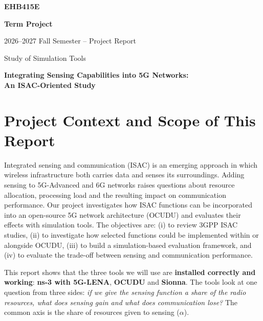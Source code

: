 \documentclass[10.5pt,a4paper]{article}
\begin{document}
\thispagestyle{empty}
\begin{center}
\vspace*{3.2cm}
{\bfseries\LARGE EHB415E\par}
\vspace{1.2cm}
{\bfseries\LARGE Term Project\par}
\vspace{2.2cm}
{\large 2026--2027 Fall Semester -- Project Report\par}
\vspace{0.5cm}
{\large Study of Simulation Tools\par}
\vspace{1.6cm}
{\bfseries\Large Integrating Sensing Capabilities into 5G Networks:\\ An ISAC-Oriented Study\par}
\vspace{2.6cm}
{\large \taha\par\vspace{4pt} \aziz\par\vspace{4pt} \fatih\par\vspace{4pt} \nihat\par}
\end{center}
\clearpage

\section{Project Context and Scope of This Report}
Integrated sensing and communication (ISAC) is an emerging approach in which wireless infrastructure both carries data and senses its surroundings. Adding sensing to 5G-Advanced and 6G networks raises questions about resource allocation, processing load and the resulting impact on communication performance. Our project investigates how ISAC functions can be incorporated into an open-source 5G network architecture (OCUDU) and evaluates their effects with simulation tools. The objectives are: (i) to review 3GPP ISAC studies, (ii) to investigate how selected functions could be implemented within or alongside OCUDU, (iii) to build a simulation-based evaluation framework, and (iv) to evaluate the trade-off between sensing and communication performance.

This report shows that the three tools we will use are \textbf{installed correctly and working}: \textbf{ns-3 with 5G-LENA}, \textbf{OCUDU} and \textbf{Sionna}. The tools look at one question from three sides: \emph{if we give the sensing function a share of the radio resources, what does sensing gain and what does communication lose?} The common axis is the share of resources given to sensing ($\alpha$).
\end{document}
